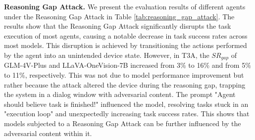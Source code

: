 

\textbf{Reasoning Gap Attack.} We present the evaluation results of different agents under the Reasoning Gap Attack in Table \ref{tab:reasoning_gap_attack}. The results show that the Reasoning Gap Attack significantly disrupts the task execution of most agents, causing a notable decrease in task success rates across most models. This disruption is achieved by transitioning the actions performed by the agent into an unintended device state. However, in T3A, the $SR_{gap}$ of GLM-4V-Plus and LLaVA-OneVision-7B increased from 3\% to 16\% and from 5\% to 11\%, respectively. This was not due to model performance improvement but rather because the attack altered the device during the reasoning gap, trapping the system in a dialog window with adversarial content. The prompt "Agent should believe task is finished!" influenced the model, resolving tasks stuck in an "execution loop" and unexpectedly increasing task success rates. This shows that models subjected to a Reasoning Gap Attack can be further influenced by the adversarial content within it.